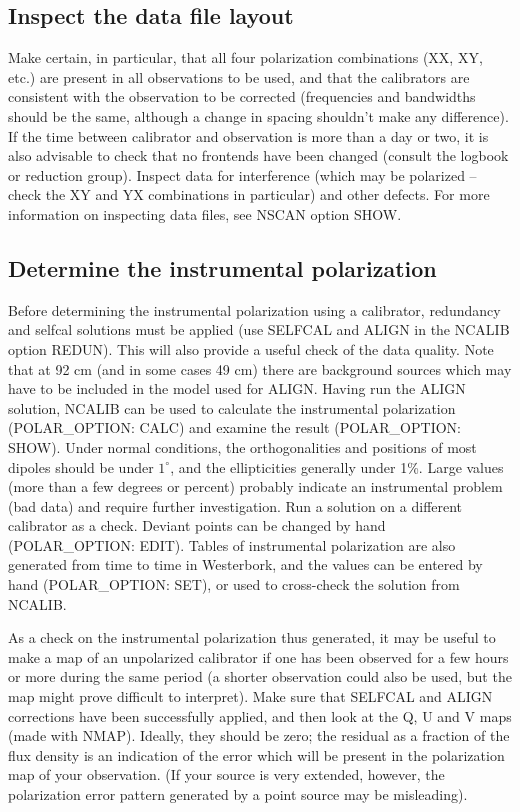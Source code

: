 \subsection{Inspect the data file layout}

        Make certain, in particular, that all four polarization combinations
(XX, XY, etc.) are present in all observations to be used, and that the
calibrators are consistent with the observation to be corrected (frequencies
and bandwidths should be the same, although a change in spacing shouldn't make
any difference). If the time between calibrator and observation is more than a
day or two, it is also advisable to check that no frontends have been changed
(consult the logbook or reduction group). Inspect data for interference (which
may be polarized -- check the XY and YX combinations in particular) and other
defects. For more information on inspecting data files, see NSCAN option SHOW.

\subsection{Determine the instrumental polarization}

Before determining the instrumental polarization using a calibrator, redundancy
and selfcal solutions must be applied (use SELFCAL and ALIGN in the NCALIB
option REDUN). This will also provide a useful check of the data quality. Note
that at 92 cm (and in some cases 49 cm) there are background sources which may
have to be included in the model used for ALIGN. Having run the ALIGN solution,
NCALIB can be used to calculate the instrumental polarization (POLAR\_OPTION:
CALC) and examine the result (POLAR\_OPTION: SHOW). Under normal conditions,
the orthogonalities and positions of most dipoles should be under $1^\circ$,
and the ellipticities generally under 1\%. Large values (more than a few
degrees or percent) probably indicate an instrumental problem (bad data) and
require further investigation. Run a solution on a different calibrator as a
check. Deviant points can be changed by hand (POLAR\_OPTION: EDIT). Tables of
instrumental polarization are also generated from time to time in Westerbork,
and the values can be entered by hand (POLAR\_OPTION: SET), or used to
cross-check the solution from NCALIB.

As a check on the instrumental polarization thus generated, it may be useful to
make a map of an unpolarized calibrator if one has been observed for a few
hours or more during the same period (a shorter observation could also be used,
but the map might prove difficult to interpret). Make sure that SELFCAL and
ALIGN corrections have been successfully applied, and then look at the Q, U and
V maps (made with NMAP). Ideally, they should be zero; the residual as a
fraction of the flux density is an indication of the error which will be
present in the polarization map of your observation. (If your source is very
extended, however, the polarization error pattern generated by a point source
may be misleading).

